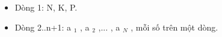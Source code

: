 \begin{itemize}
	\item     Dòng 1: N, K, P.   
	\item     Dòng 2..n+1: a    $_     1    $    , a    $_     2    $    ,... , a    $_     N    $    , mỗi số trên một dòng.   
\end{itemize}